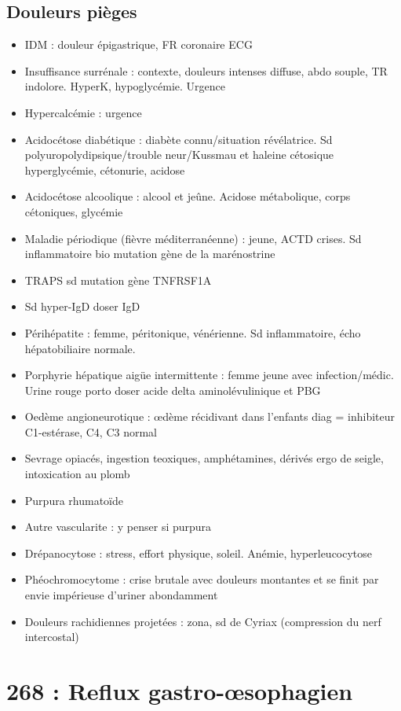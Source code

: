 \documentclass[11pt]{article}
\begin{document}
\subsection{Douleurs pièges}
\label{sec:orgc1b1e69}
\begin{itemize}
\item IDM : douleur épigastrique, FR coronaire \thus ECG
\item Insuffisance surrénale : contexte, douleurs intenses diffuse, abdo souple, TR
indolore. HyperK, hypoglycémie. Urgence \faBomb
\item Hypercalcémie : urgence \faBomb
\item Acidocétose diabétique : diabète connu/situation révélatrice. Sd
polyuropolydipsique/trouble neur/Kussmau et haleine cétosique \thus
hyperglycémie, cétonurie, acidose
\item Acidocétose alcoolique : alcool et jeûne. Acidose métabolique, \inc corps
cétoniques, glycémie \dec
\item Maladie périodique (fièvre méditerranéenne) : jeune, ACTD crises. Sd
inflammatoire bio \thus mutation gène de la marénostrine
\item TRAPS sd \thus mutation gène TNFRSF1A
\item Sd hyper-IgD \thus doser IgD
\item Périhépatite : femme, péritonique, vénérienne. Sd inflammatoire, écho
hépatobiliaire normale.
\item Porphyrie hépatique aigüe intermittente : femme jeune avec
infection/médic. Urine rouge porto \thus doser acide delta aminolévulinique et PBG
\item Oedème angioneurotique : \oe{}dème récidivant dans l'enfants \thus diag = \dec
inhibiteur C1-estérase, C4, C3 normal
\item Sevrage opiacés, ingestion teoxiques, amphétamines, dérivés ergo de seigle,
intoxication au plomb
\item Purpura rhumatoïde
\item Autre vascularite : y penser si purpura
\item Drépanocytose : stress, effort physique, soleil. Anémie, hyperleucocytose
\item Phéochromocytome : crise brutale avec douleurs montantes et se finit par envie
impérieuse d'uriner abondamment
\item Douleurs rachidiennes projetées : zona, sd de Cyriax (compression du nerf intercostal)
\end{itemize}

\section{268 : Reflux gastro-\oe{}sophagien}
\label{sec:orgb56dc4c}
\end{document}
